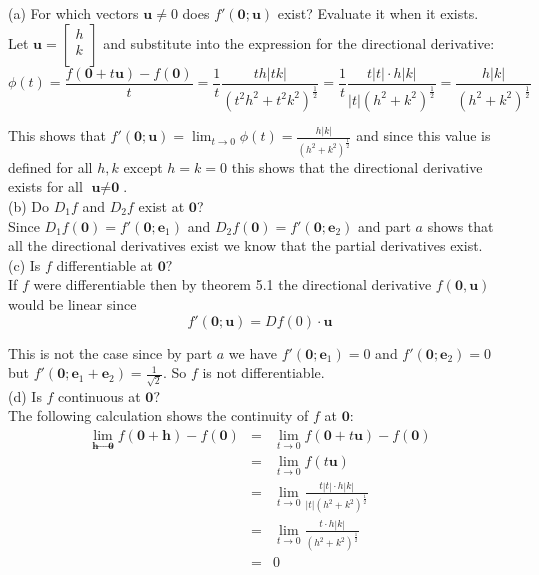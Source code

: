 \documentclass[11pt,reqno]{article}
\begin{document}
\noindent (a) For which vectors $\textbf{u} \neq 0$ does $f'(\textbf{0};\textbf{u})$ exist? Evaluate it when it exists.\\

\noindent Let $\textbf{u} = \left[ \begin{array}{c} h\\ k\\ \end{array} \right]$ and substitute into the expression for the directional derivative:
\[ \phi(t) = \frac{f(\textbf{0} + t \textbf{u}) - f(\textbf{0})}{t} = \frac{1}{t} \frac{t h |t k|}{(t^2 h^2 + t^2 k^2)^\frac{1}{2}} =  \frac{1}{t} \frac{t |t| \cdot h |k|}{|t| (h^2 + k^2)^\frac{1}{2}} = \frac{h |k|}{(h^2 + k^2)^\frac{1}{2}} \]

This shows that $f'(\textbf{0}; \textbf{u}) = \lim_{t \to 0} \phi(t) = \frac{h |k|}{(h^2 + k^2)^\frac{1}{2}}$ and since this value is defined for all $h,k$ except $h = k = 0$ this shows that the directional derivative exists for all $\textbf{u} \neq \textbf{0}$.\\

\noindent (b) Do $D_1 f$ and $D_2 f$ exist at $\textbf{0}$?\\

Since $D_1 f(\textbf{0}) = f'(\textbf{0}; \textbf{e}_1)$ and $D_2 f(\textbf{0}) = f'(\textbf{0}; \textbf{e}_2)$ and part $a$ shows that all the directional derivatives exist we know that the partial derivatives exist.\\

\noindent (c) Is $f$ differentiable at $\textbf{0}?$\\

If $f$ were differentiable then by theorem 5.1 the directional derivative $f(\textbf{0},\textbf{u})$ would be linear since
\[ f'(\textbf{0}; \textbf{u}) = D f(0) \cdot \textbf{u}\]

This is not the case since by part $a$ we have $f'(\textbf{0}; \textbf{e}_1) = 0$ and $f'(\textbf{0}; \textbf{e}_2) = 0$ but $f'(\textbf{0}; \textbf{e}_1 + \textbf{e}_2) = \frac{1}{\sqrt{2}}$. So $f$ is not differentiable.\\

\noindent (d) Is $f$ continuous at $\textbf{0}?$\\

\noindent  The following calculation shows the continuity of $f$ at $\textbf{0}$:
\begin{eqnarray*}
\lim_{\textbf{h} \to \textbf{0}} f(\textbf{0} + \textbf{h}) - f(\textbf{0}) &=& \lim_{t \to 0} f(\textbf{0} + t \textbf{u}) - f(\textbf{0})\\
&=& \lim_{t \to 0} f(t \textbf{u})\\
&=& \lim_{t \to 0} \frac{t |t| \cdot h |k|}{|t| (h^2 + k^2)^\frac{1}{2}}\\
&=& \lim_{t \to 0} \frac{t \cdot h |k|}{(h^2 + k^2)^\frac{1}{2}} \\
&=& 0
\end{eqnarray*}
\end{document}
